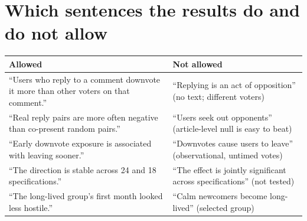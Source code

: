 \section{Which sentences the results do and do not allow}
\begin{tabularx}{\textwidth}{@{}Y Y@{}}
\toprule
Allowed & Not allowed \\
\midrule
``Users who reply to a comment downvote it more than other voters on that comment.'' & ``Replying is an act of opposition'' (no text; different voters) \\
``Real reply pairs are more often negative than co-present random pairs.'' & ``Users seek out opponents'' (article-level null is easy to beat) \\
``Early downvote exposure is associated with leaving sooner.'' & ``Downvotes cause users to leave'' (observational, untimed votes) \\
``The direction is stable across 24 and 18 specifications.'' & ``The effect is jointly significant across specifications'' (not tested) \\
``The long-lived group's first month looked less hostile.'' & ``Calm newcomers become long-lived'' (selected group) \\
\bottomrule
\end{tabularx}
